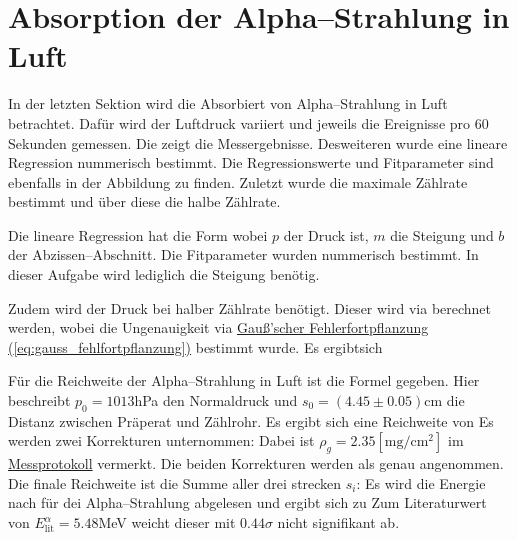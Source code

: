 \section{Absorption der Alpha--Strahlung in Luft}
\label{sec:A4}
In der letzten Sektion wird die Absorbiert von Alpha--Strahlung in Luft betrachtet. Dafür wird der Luftdruck variiert und jeweils die Ereignisse pro 60 Sekunden gemessen. 
Die  zeigt die Messergebnisse. Desweiteren wurde eine lineare Regression nummerisch bestimmt. Die Regressionswerte und Fitparameter sind ebenfalls in der Abbildung zu finden. 
Zuletzt wurde die maximale Zählrate bestimmt und über diese die halbe Zählrate. 

Die lineare Regression hat die Form
wobei $p$ der Druck ist, $m$ die Steigung und $b$ der Abzissen--Abschnitt. Die Fitparameter wurden nummerisch bestimmt. In dieser Aufgabe wird lediglich die Steigung 
benötig.


Zudem wird der Druck bei halber Zählrate benötigt. Dieser wird via
berechnet werden, wobei die Ungenauigkeit via \hyperref[eq:gauss_fehlfortpflanzung]{Gauß'scher Fehlerfortpflanzung (\ref*{eq:gauss_fehlfortpflanzung})} bestimmt wurde. Es ergibtsich

Für die Reichweite der Alpha--Strahlung in Luft ist die Formel
gegeben. Hier beschreibt $p_0 = 1013$hPa den Normaldruck und $s_0 = (4.45 \pm 0.05)$cm die Distanz zwischen Präperat und Zählrohr.
Es ergibt sich eine Reichweite von 
Es werden zwei Korrekturen unternommen:
Dabei ist $\rho_g = 2.35 [\mathrm{mg/cm^2}]$ im \hyperref[ch:Protokoll]{Messprotokoll} vermerkt. Die beiden Korrekturen werden als genau angenommen. Die finale Reichweite ist die Summe aller drei strecken $s_i$:
Es wird die Energie nach  für dei Alpha--Strahlung abgelesen und ergibt sich zu 
Zum Literaturwert von $E_\text{lit}^\alpha = 5.48$MeV weicht dieser mit $0.44\sigma$ nicht signifikant ab. 